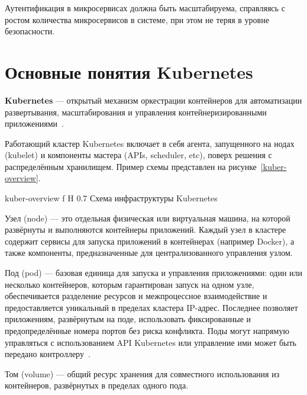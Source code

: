 Аутентификация в микросервисах должна быть масштабируема, справляясь с ростом количества микросервисов в системе, при этом не теряя в уровне безопасности.~\cite{m_auth}












\section{Основные понятия Kubernetes}

\textbf{Kubernetes} --- открытый механизм оркестрации контейнеров для автоматизации развертывания, масштабирования и управления контейнеризированными приложениями~\cite{kubernetes}.

Работающий кластер Kubernetes включает в себя агента, запущенного на нодах (kubelet) и компоненты мастера (APIs, scheduler, etc), поверх решения с распределённым хранилищем. Пример схемы представлен на рисунке~\ref{kuber-overview}.

    {kuber-overview}
    {f}
    {H}
    {0.7\textwidth}
    {Схема инфраструктуры Kubernetes}

Узел (node) --- это отдельная физическая или виртуальная машина, на которой развёрнуты и выполняются контейнеры приложений. Каждый узел в кластере содержит сервисы для запуска приложений в контейнерах (например Docker), а также компоненты, предназначенные для централизованного управления узлом.

Под (pod) --- базовая единица для запуска и управления приложениями: один или несколько контейнеров, которым гарантирован запуск на одном узле, обеспечивается разделение ресурсов и межпроцессное взаимодействие и предоставляется уникальный в пределах кластера IP-адрес. Последнее позволяет приложениям, развёрнутым на поде, использовать фиксированные и предопределённые номера портов без риска конфликта. Поды могут напрямую управляться с использованием API Kubernetes или управление ими может быть передано контроллеру~\cite{kubernetes}.

Том (volume) --- общий ресурс хранения для совместного использования из контейнеров, развёрнутых в пределах одного пода.

